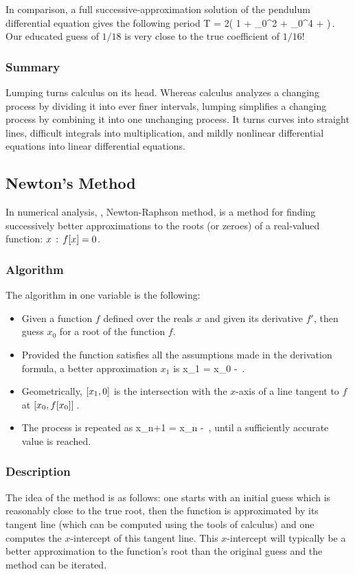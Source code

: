 In comparison, a full successive-approximation solution of the pendulum differential equation gives the following period
\beq
T = 2\pi {}\left( 1 + \theta_0^2 + \theta_0^4 + \dotsb \right)\,.
\eeq
Our educated guess of $1/18$ is very close to the true coefficient of $1/16$!


\subsubsection{Summary}
Lumping turns calculus on its head. Whereas calculus analyzes a changing process by dividing it into ever finer intervals, lumping simplifies a changing process by combining it into one unchanging process. It turns curves into straight lines, difficult integrals into multiplication, and mildly nonlinear differential equations into linear differential equations.


\subsection{Newton's Method}
In numerical analysis, , \aka Newton-Raphson method, is a method for finding successively better approximations to the roots (or zeroes) of a real-valued function: $x\,:\,f\!\left[{x}\right] = 0$.


\subsubsection{Algorithm}
The algorithm in one variable is the following:
\begin{itemize}
%
\item Given a function $f$ defined over the reals $x$ and given its derivative $f'$, then guess $x_0$ for a root of the function $f$.
%
\item Provided the function satisfies all the assumptions made in the derivation formula, a better approximation $x_1$ is
\beq
x_1 = x_0 - \,.
\eeq
%
\item Geometrically, $\left[{x_1,0}\right]$ is the intersection with the $x$-axis of a line tangent to $f$ at $\left[{x_0, f\!\left[{x_0}\right]}\right]$\,.
%
\item The process is repeated as
\beq
x_{n+1} = x_n - \,,
\eeq
until a sufficiently accurate value is reached.
%
\end{itemize}


\subsubsection{Description}
The idea of the method is as follows: one starts with an initial guess which is reasonably close to the true root, then the function is approximated by its tangent line (which can be computed using the tools of calculus) and one computes the $x$-intercept of this tangent line. This $x$-intercept will typically be a better approximation to the function's root than the original guess and the method can be iterated.

